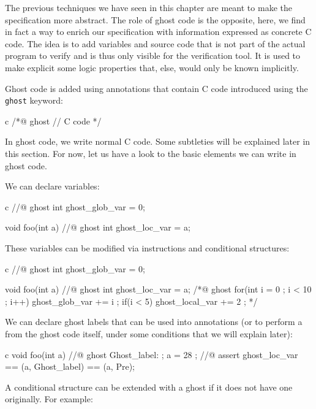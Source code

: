 
The previous techniques we have seen in this chapter are meant to make the
specification more abstract. The role of ghost code is the opposite, here, we
find in fact a way to enrich our specification with information expressed as
concrete C code. The idea is to add variables and source code that is not part
of the actual program to verify and is thus only visible for the verification
tool. It is used to make explicit some logic properties that, else, would only
be known implicitly.




Ghost code is added using annotations that contain C code
introduced using the \texttt{ghost} keyword:


\begin{CodeBlock}{c}
/*@
  ghost
  // C code
*/
\end{CodeBlock}


In ghost code, we write normal C code. Some subtleties will be explained
later in this section. For now, let us have a look to the basic elements
we can write in ghost code.


We can declare variables:


\begin{CodeBlock}{c}
//@ ghost int ghost_glob_var = 0;

void foo(int a){
  //@ ghost int ghost_loc_var = a;
}
\end{CodeBlock}


These variables can be modified via instructions and conditional structures:


\begin{CodeBlock}{c}
//@ ghost int ghost_glob_var = 0;

void foo(int a){
  //@ ghost int ghost_loc_var = a;
  /*@ ghost
    for(int i = 0 ; i < 10 ; i++){
      ghost_glob_var += i ;
      if(i < 5) ghost_local_var += 2 ;
    }
  */
}
\end{CodeBlock}


We can declare ghost labels that can be used into annotations (or to perform
a  from the ghost code itself, under some conditions that
we will explain later):


\begin{CodeBlock}{c}
void foo(int a){
  //@ ghost Ghost_label: ;
  a = 28 ;
  //@ assert ghost_loc_var == \at(a, Ghost_label) == \at(a, Pre);
}
\end{CodeBlock}


A conditional structure  can be extended with a ghost
 if it does not have one originally. For example:


